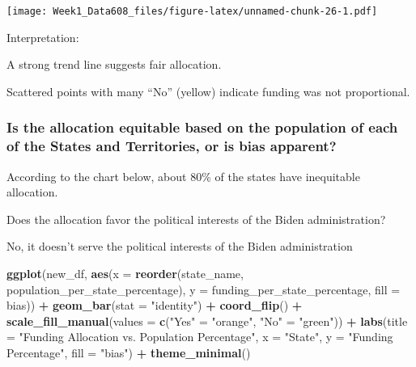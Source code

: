 \documentclass[
]{article}
\newenvironment{Shaded}{\begin{snugshade}}{\end{snugshade}}
\newcommand{\AttributeTok}[1]{\textcolor[rgb]{0.13,0.29,0.53}{#1}}
\newcommand{\FunctionTok}[1]{\textcolor[rgb]{0.13,0.29,0.53}{\textbf{#1}}}
\newcommand{\NormalTok}[1]{#1}
\newcommand{\OtherTok}[1]{\textcolor[rgb]{0.56,0.35,0.01}{#1}}
\newcommand{\SpecialCharTok}[1]{\textcolor[rgb]{0.81,0.36,0.00}{\textbf{#1}}}
\newcommand{\StringTok}[1]{\textcolor[rgb]{0.31,0.60,0.02}{#1}}
\begin{document}
\texttt{[image: Week1\_Data608\_files/figure-latex/unnamed-chunk-26-1.pdf]}

Interpretation:

A strong trend line suggests fair allocation.

Scattered points with many ``No'' (yellow) indicate funding was not
proportional.

\subsubsection{Is the allocation equitable based on the population of
each of the States and Territories, or is bias
apparent?}\label{is-the-allocation-equitable-based-on-the-population-of-each-of-the-states-and-territories-or-is-bias-apparent}

According to the chart below, about 80\% of the states have inequitable
allocation.

Does the allocation favor the political interests of the Biden
administration?

No, it doesn't serve the political interests of the Biden administration

\begin{Shaded}
\begin{Highlighting}[]
\FunctionTok{ggplot}\NormalTok{(new\_df, }\FunctionTok{aes}\NormalTok{(}\AttributeTok{x =} \FunctionTok{reorder}\NormalTok{(state\_name, population\_per\_state\_percentage), }
                   \AttributeTok{y =}\NormalTok{ funding\_per\_state\_percentage, }
                   \AttributeTok{fill =}\NormalTok{ bias)) }\SpecialCharTok{+}
  \FunctionTok{geom\_bar}\NormalTok{(}\AttributeTok{stat =} \StringTok{"identity"}\NormalTok{) }\SpecialCharTok{+}
  \FunctionTok{coord\_flip}\NormalTok{() }\SpecialCharTok{+}
  \FunctionTok{scale\_fill\_manual}\NormalTok{(}\AttributeTok{values =} \FunctionTok{c}\NormalTok{(}\StringTok{"Yes"} \OtherTok{=} \StringTok{"orange"}\NormalTok{, }\StringTok{"No"} \OtherTok{=} \StringTok{"green"}\NormalTok{)) }\SpecialCharTok{+}
  \FunctionTok{labs}\NormalTok{(}\AttributeTok{title =} \StringTok{"Funding Allocation vs. Population Percentage"}\NormalTok{,}
       \AttributeTok{x =} \StringTok{"State"}\NormalTok{,}
       \AttributeTok{y =} \StringTok{"Funding Percentage"}\NormalTok{,}
       \AttributeTok{fill =} \StringTok{"bias"}\NormalTok{) }\SpecialCharTok{+}
  \FunctionTok{theme\_minimal}\NormalTok{()}
\end{Highlighting}
\end{Shaded}
\end{document}
